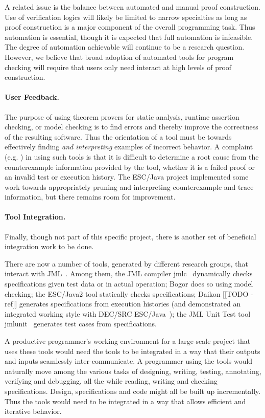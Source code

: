 \documentclass{acm_proc_article-sp}
\begin{document}
A related issue is the balance between automated and manual proof construction.
Use of verification logics will likely be limited to narrow specialties as long as proof
construction is a major component of the overall programming task.  Thus automation
is essential, though it is expected that full automation is infeasible.  The degree of
automation achievable will continue to be a research question. 
However, we believe that broad adoption of automated tools for program checking 
will require that users only need interact at high levels of proof construction.

\paragraph*{User Feedback.} The purpose of using theorem provers for
static analysis, runtime assertion checking, or model checking is to
find errors and thereby improve the correctness of the resulting
software.  Thus the orientation of a tool must be towards effectively
finding {\em and interpreting} examples of incorrect behavior.  A
complaint (e.g. \cite{GroceVisser03}) in using such tools is that it is difficult
to determine a root cause from the counterexample information provided
by the tool, whether it is a failed proof or an invalid test or
execution history.  The ESC/Java project implemented some work towards
appropriately pruning and interpreting counterexample and trace information, but
there remains room for improvement.

\paragraph*{Tool Integration.} Finally, though not part of this specific
project, there is another set of beneficial integration work to be
done.

There are now a number of tools, generated by different research
groups, that interact with JML~\cite{Burdy-etal03}.  Among them, the
JML compiler jmlc~\cite{Cheon-Leavens02b} dynamically checks
specifications given test data or in actual operation; 
Bogor \cite{Bogor03} does so using model checking;
the ESC/Java2 tool statically checks specifications;
Daikon [[TODO - ref]] generates specifications from execution histories (and demonstrated an
integrated working style
with DEC/SRC ESC/Java~\cite{NimmerErnst01});
the JML Unit Test tool jmlunit~\cite{Cheon-Leavens02} generates test
cases from specifications.
 
A productive programmer's working environment for a large-scale
project that uses these tools would need the tools to be integrated in
a way that their outputs and inputs seamlessly inter-communicate.  A
programmer using the tools would naturally move among the various
tasks of designing, writing,
testing, annotating, verifying and debugging, all the while reading, writing
and checking specifications.  Design, specifications and code might all
be built up incrementally.  Thus the tools would
need to be integrated in a way that allows efficient and iterative
behavior.
\end{document}
